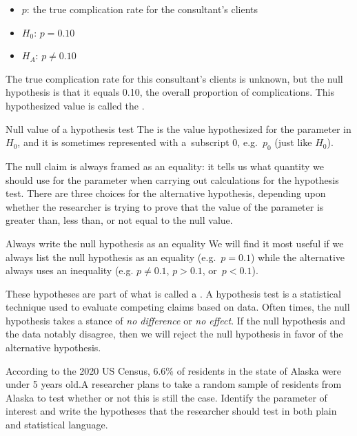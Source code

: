 \begin{itemize}
\item[] $p$:  the true complication rate for the consultant's clients
\item[] $H_0$: $p=0.10$ 
\item[] $H_A$: $p \neq 0.10$
\end{itemize}

The true complication rate for this consultant's clients is unknown, but the null hypothesis is that it equals 0.10, the overall proportion of complications. This hypothesized value is called the .

\begin{onebox}{Null value of a hypothesis test}
The  is the value hypothesized for the parameter in $H_0$, and it is sometimes represented with a~subscript 0, e.g.~$p_0$ (just like $H_0$).\end{onebox}

The null claim is always framed as an equality: it tells us what quantity we should use for the parameter when carrying out calculations for the hypothesis test. There are three choices for the alternative hypothesis, depending upon whether the researcher is trying to prove that the value of the parameter is greater than, less than, or not equal to the null value.

\begin{onebox}{Always write the null hypothesis as an equality}
We will find it most useful if we always list the null hypothesis as an equality (e.g.~$p = 0.1$) while the alternative always uses an inequality (e.g. $p \neq 0.1$, $p>0.1$, or~$p<0.1$).\end{onebox}


These hypotheses are part of what is called a . A hypothesis test is a statistical technique used to evaluate competing claims based on data. Often times, the null hypothesis takes a stance of \emph{no difference} or \emph{no effect}. If the null hypothesis and the data notably disagree, then we will reject the null hypothesis in favor of the alternative hypothesis.  

\begin{exercisewrap}
\begin{nexercise}
According to the 2020 US Census, 6.6\% of residents in the state of Alaska were under 5 years old.\footnotemark  A researcher plans to take a random sample of residents from Alaska to test whether or not this is still the case. Identify the parameter of interest and write the hypotheses that the researcher should test in both plain and statistical language.\footnotemark
\end{nexercise}
\end{exercisewrap}

